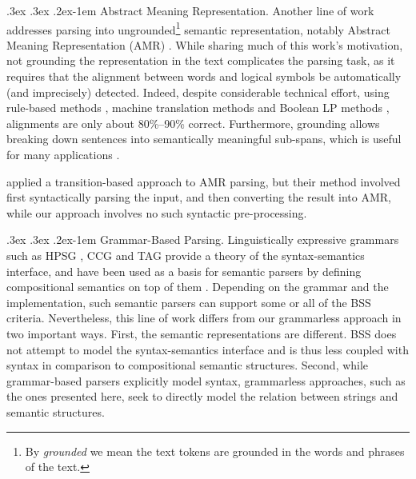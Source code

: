 \documentclass[11pt,letterpaper]{article}
\makeatletter
\renewcommand{\paragraph}{
  \@startsection{paragraph}{4}
  {\z@}{.3ex \@plus .3ex \@minus .2ex}{-1em}
  {\normalfont\normalsize\bfseries}
}
\makeatother
\begin{document}
\paragraph{Abstract Meaning Representation.}
Another line of work addresses parsing into
ungrounded\footnote{By \textit{grounded} we mean the text tokens are grounded in
  the words and phrases of the text.}
semantic representation, notably Abstract Meaning Representation (AMR)
\cite{flanigan2014discriminative,vanderwende2015amr,pust2015parsing,artzi2015broad}. 
While sharing much of this work's motivation,
not grounding the representation in the text
complicates the parsing task, as it requires
that the alignment between words and logical symbols be automatically
(and imprecisely) detected. Indeed, despite considerable technical effort,
using rule-based methods \cite{flanigan2014discriminative}, machine translation methods \cite{pourdamghani2014aligning} and Boolean LP methods \cite{werling2015robust}, alignments are only about 80\%--90\% correct.
Furthermore, grounding allows breaking down sentences into semantically meaningful sub-spans,
which is useful for many applications \cite{fernandez2015parsing}.

 applied a transition-based approach to AMR parsing,
but their method involved first syntactically parsing the input, and then converting
the result into AMR, while our approach involves no such syntactic pre-processing.

\paragraph{Grammar-Based Parsing.}
Linguistically expressive grammars such as HPSG \cite{PandS:94}, CCG \cite{Steedman:00} and TAG \cite{Joshi:97}
provide a theory of the syntax-semantics interface, and have been used as a basis for semantic parsers
by defining compositional semantics on top of them \cite[among others]{Flic:00,bos2005towards}.
Depending on the grammar and the implementation, such semantic parsers can support
some or all of the BSS criteria.
Nevertheless, this line of work differs from our grammarless approach in two important ways.
First, the semantic representations are different. BSS does not attempt to model
the syntax-semantics interface and is thus less coupled with syntax in comparison to
compositional semantic structures.
Second, while grammar-based parsers explicitly model syntax, grammarless
approaches, such as the ones presented here, seek to directly model the relation between
strings and semantic structures.
\end{document}
